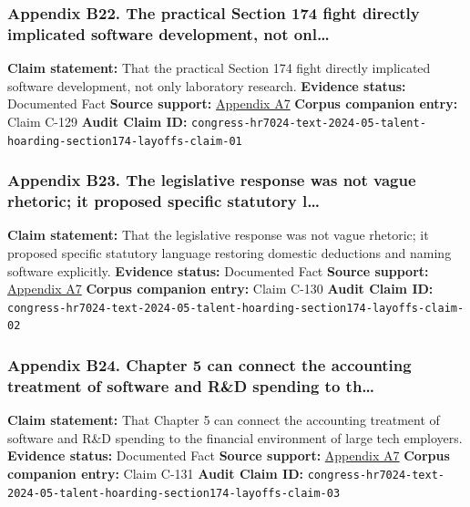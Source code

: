 \documentclass[
  american,
  11pt,
  letterpaper,
]{article}
\begin{document}
\subsubsection{Appendix B22. The practical Section 174 fight directly
implicated software development, not
onl\ldots{}}\label{ch-05-appendix-b22-the-practical-section-174-fight-directly-implicated-software-development-not-onl}

\textbf{Claim statement:} That the practical Section 174 fight directly
implicated software development, not only laboratory research.
\textbf{Evidence status:} Documented Fact \textbf{Source support:}
\hyperref[ch-05-appendix-a7-h-r-7024-text-deduction-for-domestic-research-and-experimental-expenditures]{Appendix
A7} \textbf{Corpus companion entry:} Claim C-129 \textbf{Audit Claim
ID:}
\texttt{congress-hr7024-text-2024-05-talent-hoarding-section174-layoffs-claim-01}

\subsubsection{Appendix B23. The legislative response was not vague
rhetoric; it proposed specific statutory
l\ldots{}}\label{ch-05-appendix-b23-the-legislative-response-was-not-vague-rhetoric-it-proposed-specific-statutory-l}

\textbf{Claim statement:} That the legislative response was not vague
rhetoric; it proposed specific statutory language restoring domestic
deductions and naming software explicitly. \textbf{Evidence status:}
Documented Fact \textbf{Source support:}
\hyperref[ch-05-appendix-a7-h-r-7024-text-deduction-for-domestic-research-and-experimental-expenditures]{Appendix
A7} \textbf{Corpus companion entry:} Claim C-130 \textbf{Audit Claim
ID:}
\texttt{congress-hr7024-text-2024-05-talent-hoarding-section174-layoffs-claim-02}

\subsubsection{Appendix B24. Chapter 5 can connect the accounting
treatment of software and R\&D spending to
th\ldots{}}\label{ch-05-appendix-b24-chapter-5-can-connect-the-accounting-treatment-of-software-and-r-d-spending-to-th}

\textbf{Claim statement:} That Chapter 5 can connect the accounting
treatment of software and R\&D spending to the financial environment of
large tech employers. \textbf{Evidence status:} Documented Fact
\textbf{Source support:}
\hyperref[ch-05-appendix-a7-h-r-7024-text-deduction-for-domestic-research-and-experimental-expenditures]{Appendix
A7} \textbf{Corpus companion entry:} Claim C-131 \textbf{Audit Claim
ID:}
\texttt{congress-hr7024-text-2024-05-talent-hoarding-section174-layoffs-claim-03}
\end{document}
